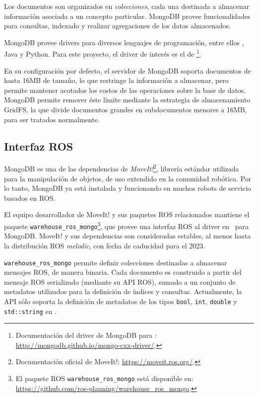 Los documentos son organizados en \textit{colecciones}, cada una destinada a almacenar información asociada a un concepto particular. MongoDB provee funcionalidades para consultas, indexado y realizar agregaciones de los datos almacenados.

MongoDB provee drivers para diversos lenguajes de programación, entre ellos \CC, Java y Python. Para este proyecto, el driver de interés es el de \CC\footnote{Documentación del driver de MongoDB para \CC:  \url{http://mongodb.github.io/mongo-cxx-driver/}.}.

En su configuración por defecto, el servidor de MongoDB soporta documentos de hasta 16MB de tamaño, lo que restringe la información a almacenar, pero permite mantener acotados los costos de las operaciones sobre la base de datos. MongoDB permite remover éste límite mediante la estrategia de almacenamiento GridFS, la que divide documentos grandes en subdocumentos menores a 16MB, para ser tratados normalmente.

\subsection{Interfaz ROS}

MongoDB es una de las dependencias de \textit{MoveIt!}\footnote{Documentación oficial de MoveIt!: \url{https://moveit.ros.org/}.}, librería estándar utilizada para la manipulación de objetos, de uso extendido en la comunidad robótica. Por lo tanto, MongoDB ya está instalada y funcionando en muchos robots de servicio basados en ROS. 

El equipo desarrollador de MoveIt! y sus paquetes ROS relacionados mantiene el paquete \texttt{warehouse\_ros\_mongo}\footnote{El paquete ROS \texttt{warehouse\_ros\_mongo} está disponible en: \url{https://github.com/ros-planning/warehouse\_ros\_mongo}.}, que provee una interfaz ROS al driver en \CC\ para MongoDB. MoveIt! y sus dependencias son consideradas estables, al menos hasta la distribución ROS \textit{melodic}, con fecha de caducidad para el 2023.

\texttt{warehouse\_ros\_mongo} permite definir colecciones destinadas a almacenar mensajes ROS, de manera binaria. Cada documento es construido a partir del mensaje ROS serializado (mediante su API ROS), sumado a un conjunto de metadatos utilizados para la definición de índices y consultas. Actualmente, la API sólo soporta la definición de metadatos de los tipos \texttt{bool}, \texttt{int}, \texttt{double} y \texttt{std::string} en \CC.


